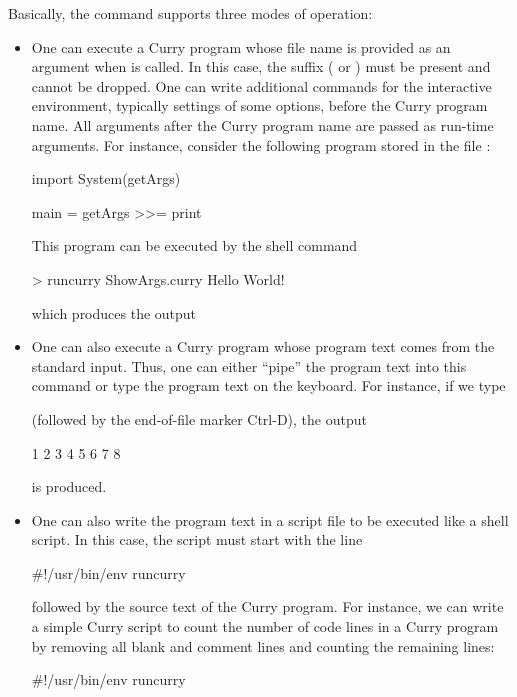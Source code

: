 Basically, the command  supports three modes of operation:
\begin{itemize}
\item
One can execute a Curry program whose file name
is provided as an argument when  is called.
In this case, the suffix ( or )
must be present and cannot be dropped.
One can write additional commands for the interactive environment,
typically settings of some options, before the Curry program name.
All arguments after the Curry program name are passed as run-time
arguments. For instance, consider the following program stored
in the file :
\begin{curry}
import System(getArgs)

main = getArgs >>= print
\end{curry}
This program can be executed by the shell command
\begin{curry}
> runcurry ShowArgs.curry Hello World!
\end{curry}
which produces the output
\begin{curry}
\end{curry}

\item
One can also execute a Curry program whose program text
comes from the standard input. Thus, one can either ``pipe''
the program text into this command or type the program text on
the keyboard. For instance, if we type
(followed by the end-of-file marker Ctrl-D), the output
\begin{curry}
1
2
3
4
5
6
7
8
\end{curry}
is produced.

\item
One can also write the program text in a script file to be executed
like a shell script. In this case, the script must start with the line
\begin{curry}
#!/usr/bin/env runcurry
\end{curry}
followed by the source text of the Curry program.
For instance, we can write a simple Curry script to count the
number of code lines in a Curry program by removing all blank
and comment lines and counting the remaining lines:
\begin{currynomath}
#!/usr/bin/env runcurry


\end{currynomath}
\end{itemize}
